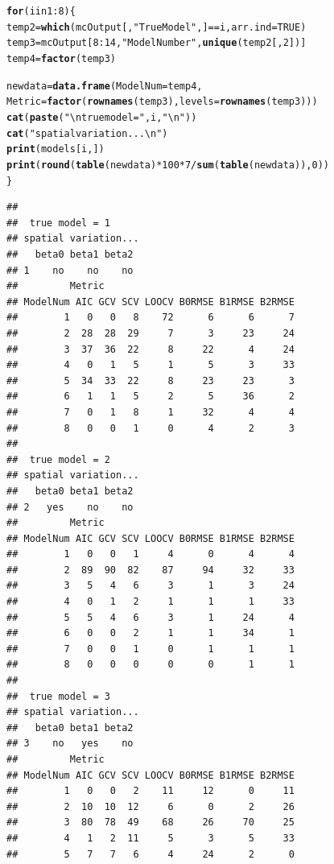 \documentclass{article}\usepackage[]{graphicx}\usepackage[]{color}
\makeatletter
\newcommand{\hlstr}[1]{\textcolor[rgb]{0.192,0.494,0.8}{#1}}%
\newcommand{\hlkwd}[1]{\textcolor[rgb]{0.737,0.353,0.396}{\textbf{#1}}}%
\newenvironment{kframe}{%
 \def\at@end@of@kframe{}%
 \ifinner\ifhmode%
  \def\at@end@of@kframe{\end{minipage}}%
  \begin{minipage}{\columnwidth}%
 \fi\fi%
 \def\FrameCommand##1{\hskip\@totalleftmargin \hskip-\fboxsep
 \colorbox{shadecolor}{##1}\hskip-\fboxsep
     \hskip-\linewidth \hskip-\@totalleftmargin \hskip\columnwidth}%
 \MakeFramed {\advance\hsize-\width
   \@totalleftmargin\z@ \linewidth\hsize
   \@setminipage}}%
 {\par\unskip\endMakeFramed%
 \at@end@of@kframe}
\newenvironment{knitrout}{}{} %
\makeatother
\begin{document}
\begin{knitrout}
\color{fgcolor}\begin{kframe}
\begin{alltt}
\hlkwd{for} (i in 1:8) \{
  temp2 = \hlkwd{which}(mcOutput[,\hlstr{"True Model"} ,] == i, arr.ind = TRUE)
  temp3 = mcOutput[8:14, \hlstr{"Model Number"}, \hlkwd{unique}(temp2[, 2])]
  temp4 = \hlkwd{factor}(temp3)
  
  newdata = \hlkwd{data.frame}(ModelNum = temp4, 
                       Metric = \hlkwd{factor}(\hlkwd{rownames}(temp3), levels = \hlkwd{rownames}(temp3)))
  \hlkwd{cat}(\hlkwd{paste}(\hlstr{"\textbackslash{}n true model ="}, i, \hlstr{"\textbackslash{}n"}))
  \hlkwd{cat}(\hlstr{"spatial variation...\textbackslash{}n"})
  \hlkwd{print}(models[i, ])
  \hlkwd{print}(\hlkwd{round}(\hlkwd{table}(newdata)*100*7/\hlkwd{sum}(\hlkwd{table}(newdata)), 0))
\}
\end{alltt}
\begin{verbatim}
## 
##  true model = 1 
## spatial variation...
##   beta0 beta1 beta2
## 1    no    no    no
##         Metric
## ModelNum AIC GCV SCV LOOCV B0RMSE B1RMSE B2RMSE
##        1   0   0   8    72      6      6      7
##        2  28  28  29     7      3     23     24
##        3  37  36  22     8     22      4     24
##        4   0   1   5     1      5      3     33
##        5  34  33  22     8     23     23      3
##        6   1   1   5     2      5     36      2
##        7   0   1   8     1     32      4      4
##        8   0   0   1     0      4      2      3
## 
##  true model = 2 
## spatial variation...
##   beta0 beta1 beta2
## 2   yes    no    no
##         Metric
## ModelNum AIC GCV SCV LOOCV B0RMSE B1RMSE B2RMSE
##        1   0   0   1     4      0      4      4
##        2  89  90  82    87     94     32     33
##        3   5   4   6     3      1      3     24
##        4   0   1   2     1      1      1     33
##        5   5   4   6     3      1     24      4
##        6   0   0   2     1      1     34      1
##        7   0   0   1     0      1      1      1
##        8   0   0   0     0      0      1      1
## 
##  true model = 3 
## spatial variation...
##   beta0 beta1 beta2
## 3    no   yes    no
##         Metric
## ModelNum AIC GCV SCV LOOCV B0RMSE B1RMSE B2RMSE
##        1   0   0   2    11     12      0     11
##        2  10  10  12     6      0      2     26
##        3  80  78  49    68     26     70     25
##        4   1   2  11     5      3      5     33
##        5   7   7   6     4     24      2      0

\end{verbatim}
\end{kframe}
\end{knitrout}
\end{document}
